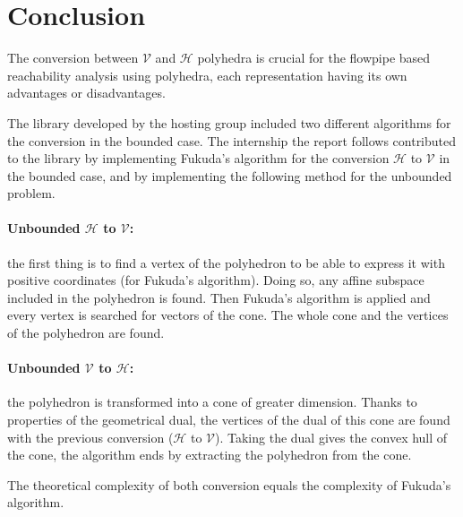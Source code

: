 \section{Conclusion}
\label{section_conclusion}
The conversion between $\mathcal{V}$ and $\mathcal{H}$ polyhedra is crucial for the flowpipe based reachability analysis using polyhedra, each representation having its own advantages or disadvantages.

The library developed by the hosting group included two different algorithms for the conversion in the bounded case. The internship the report follows contributed to the library by implementing Fukuda's algorithm for the conversion $\mathcal{H}$ to $\mathcal{V}$ in the bounded case, and by implementing the following method for the unbounded problem.

\paragraph{Unbounded $\mathcal{H}$ to $\mathcal{V}$:} the first thing is to find a vertex of the polyhedron to be able to express it with positive coordinates (for Fukuda's algorithm). Doing so, any affine subspace included in the polyhedron is found. Then Fukuda's algorithm is applied and every vertex is searched for vectors of the cone. The whole cone and the vertices of the polyhedron are found. 

\paragraph{Unbounded $\mathcal{V}$ to $\mathcal{H}$:} the polyhedron is transformed into a cone of greater dimension. Thanks to properties of the geometrical dual, the vertices of the dual of this cone are found with the previous conversion ($\mathcal{H}$ to $\mathcal{V}$). Taking the dual gives the convex hull of the cone, the algorithm ends by extracting the polyhedron from the cone.

The theoretical complexity of both conversion equals the complexity of Fukuda's algorithm.